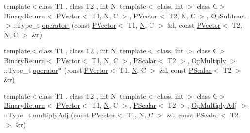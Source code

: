 \begin{DoxyCompactItemize}
\item 
{\footnotesize template$<$class T1 , class T2 , int N, template$<$ class, int $>$ class C$>$ }\\\mbox{\hyperlink{structENSEM_1_1BinaryReturn}{Binary\+Return}}$<$ \mbox{\hyperlink{classENSEM_1_1PVector}{P\+Vector}}$<$ T1, \mbox{\hyperlink{operator__name__util_8cc_a7722c8ecbb62d99aee7ce68b1752f337}{N}}, C $>$, \mbox{\hyperlink{classENSEM_1_1PVector}{P\+Vector}}$<$ T2, \mbox{\hyperlink{operator__name__util_8cc_a7722c8ecbb62d99aee7ce68b1752f337}{N}}, C $>$, \mbox{\hyperlink{structENSEM_1_1OpSubtract}{Op\+Subtract}} $>$\+::Type\+\_\+t \mbox{\hyperlink{group__primvector_ga88c10d1dc134a68481b630e96762938a}{operator-\/}} (const \mbox{\hyperlink{classENSEM_1_1PVector}{P\+Vector}}$<$ T1, \mbox{\hyperlink{operator__name__util_8cc_a7722c8ecbb62d99aee7ce68b1752f337}{N}}, C $>$ \&l, const \mbox{\hyperlink{classENSEM_1_1PVector}{P\+Vector}}$<$ T2, \mbox{\hyperlink{operator__name__util_8cc_a7722c8ecbb62d99aee7ce68b1752f337}{N}}, C $>$ \&r)
\item 
{\footnotesize template$<$class T1 , class T2 , int N, template$<$ class, int $>$ class C$>$ }\\\mbox{\hyperlink{structENSEM_1_1BinaryReturn}{Binary\+Return}}$<$ \mbox{\hyperlink{classENSEM_1_1PVector}{P\+Vector}}$<$ T1, \mbox{\hyperlink{operator__name__util_8cc_a7722c8ecbb62d99aee7ce68b1752f337}{N}}, C $>$, \mbox{\hyperlink{classENSEM_1_1PScalar}{P\+Scalar}}$<$ T2 $>$, \mbox{\hyperlink{structENSEM_1_1OpMultiply}{Op\+Multiply}} $>$\+::Type\+\_\+t \mbox{\hyperlink{group__primvector_ga345fa1d5e68f5801446f6ff69feb2121}{operator$\ast$}} (const \mbox{\hyperlink{classENSEM_1_1PVector}{P\+Vector}}$<$ T1, \mbox{\hyperlink{operator__name__util_8cc_a7722c8ecbb62d99aee7ce68b1752f337}{N}}, C $>$ \&l, const \mbox{\hyperlink{classENSEM_1_1PScalar}{P\+Scalar}}$<$ T2 $>$ \&r)
\item 
{\footnotesize template$<$class T1 , class T2 , int N, template$<$ class, int $>$ class C$>$ }\\\mbox{\hyperlink{structENSEM_1_1BinaryReturn}{Binary\+Return}}$<$ \mbox{\hyperlink{classENSEM_1_1PVector}{P\+Vector}}$<$ T1, \mbox{\hyperlink{operator__name__util_8cc_a7722c8ecbb62d99aee7ce68b1752f337}{N}}, C $>$, \mbox{\hyperlink{classENSEM_1_1PScalar}{P\+Scalar}}$<$ T2 $>$, \mbox{\hyperlink{structENSEM_1_1OpMultiplyAdj}{Op\+Multiply\+Adj}} $>$\+::Type\+\_\+t \mbox{\hyperlink{group__primvector_gab03f792e64e0e2073c0ab9f04fa4518f}{multiply\+Adj}} (const \mbox{\hyperlink{classENSEM_1_1PVector}{P\+Vector}}$<$ T1, \mbox{\hyperlink{operator__name__util_8cc_a7722c8ecbb62d99aee7ce68b1752f337}{N}}, C $>$ \&l, const \mbox{\hyperlink{classENSEM_1_1PScalar}{P\+Scalar}}$<$ T2 $>$ \&r)

\end{DoxyCompactItemize}
